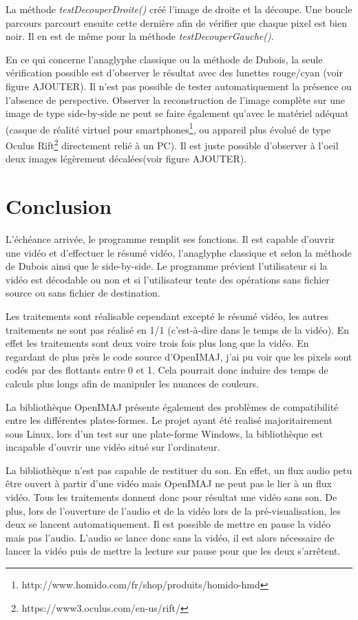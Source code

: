 \documentclass[10pt,a4paper]{article}
\begin{document}
La méthode \textit{testDecouperDroite()} créé l'image de droite et la découpe. Une boucle parcours parcourt ensuite cette dernière afin de vérifier que chaque pixel est bien noir. Il en est de même pour la méthode \textit{testDecouperGauche()}.

En ce qui concerne l'anaglyphe classique ou la méthode de Dubois, la seule vérification possible est d'observer le résultat avec des lunettes rouge/cyan (voir figure AJOUTER). Il n'est pas possible de tester automatiquement la présence ou l'absence de perspective. Observer la reconstruction de l'image complète sur une image de type side-by-side ne peut se faire également qu'avec le matériel adéquat (casque de réalité virtuel pour smartphones\footnote{http://www.homido.com/fr/shop/produits/homido-hmd}, ou appareil plus évolué de type Oculus Rift\footnote{https://www3.oculus.com/en-us/rift/} directement relié à un PC). Il est juste possible d'observer à l'oeil deux images légèrement décalées(voir figure AJOUTER).

\section{Conclusion}

L'échéance arrivée, le programme remplit ses fonctions. Il est capable d'ouvrir une vidéo et d'effectuer le résumé vidéo, l'anaglyphe classique et selon la méthode de Dubois ainsi que le side-by-side. Le programme prévient l'utilisateur si la vidéo est décodable ou non et si l'utilisateur tente des opérations sans fichier source ou sans fichier de destination.

Les traitements sont réalisable cependant excepté le résumé vidéo, les autres traitements ne sont pas réalisé en 1/1 (c'est-à-dire dans le temps de la vidéo). En effet les traitements sont deux voire trois fois plus long que la vidéo. En regardant de plus près le code source d'OpenIMAJ, j'ai pu voir que les pixels sont codés par des flottants entre  0 et 1. Cela pourrait donc induire des temps de calculs plus longs afin de manipuler les nuances de couleurs.

La bibliothèque OpenIMAJ présente également des problèmes de compatibilité entre les différentes plates-formes. Le projet ayant été realisé majoritairement sous Linux, lors d'un test sur une plate-forme Windows, la bibliothèque est incapable d'ouvrir une vidéo situé sur l'ordinateur.

La bibliothèque n'est pas capable de restituer du son. En effet, un flux audio petu être ouvert à partir d'une vidéo mais OpenIMAJ ne peut pas le lier à un flux vidéo. Tous les traitements donnent donc pour résultat une vidéo sans son. De plus, lors de l'ouverture de l'audio et de la vidéo lors de la pré-visualisation, les deux se lancent automatiquement. Il est possible de mettre en pause la vidéo mais pas l'audio. L'audio se lance donc sans la vidéo, il est alors nécessaire de lancer la vidéo puis de mettre la lecture sur pause pour que les deux s'arrêtent.
\end{document}

